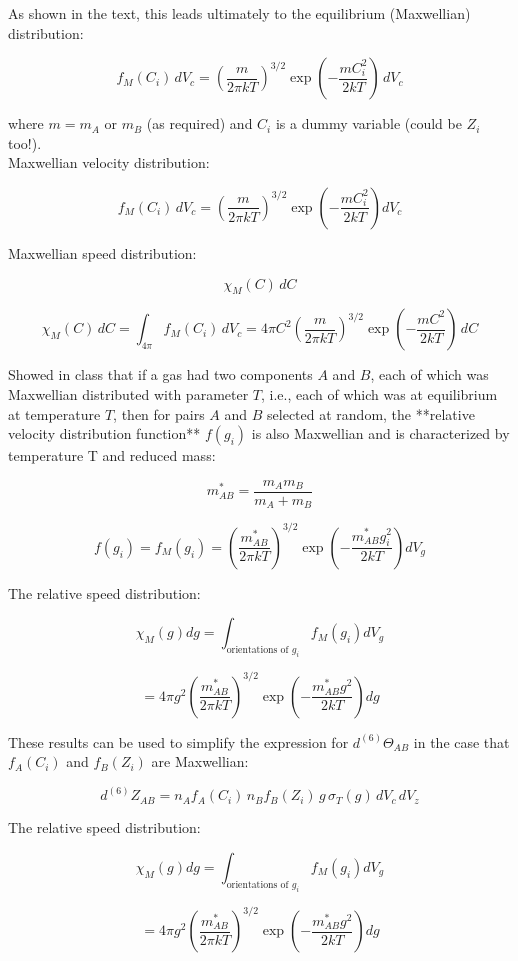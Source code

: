 \documentclass{article}
\begin{document}
As shown in the text, this leads ultimately to the equilibrium (Maxwellian) distribution:

\[
f_M(C_i) \, dV_c = \left( \frac{m}{2\pi k T} \right)^{3/2} \exp \left( - \frac{m C_i^2}{2 k T} \right) \, dV_c
\]

where \( m = m_A \) or \( m_B \) (as required) and \( C_i \) is a dummy variable (could be \( Z_i \) too!).\\


Maxwellian velocity distribution:

\[
f_M(C_i) \, dV_c = \left( \frac{m}{2\pi k T} \right)^{3/2} \exp \left( - \frac{m C_i^2}{2 k T} \right) dV_c
\]

Maxwellian speed distribution:

\[
\chi_M(C) \, dC
\]

\[
\chi_M(C) \, dC = \int_{4 \pi} f_M(C_i) \, dV_c = 4 \pi C^2 \left( \frac{m}{2\pi k T} \right)^{3/2} \exp \left( - \frac{m C^2}{2 k T} \right) \, dC
\]

Showed in class that if a gas had two components \( A \) and \( B \), each of which was Maxwellian distributed with parameter \( T \), i.e., each of which was at equilibrium at temperature \( T \), then for pairs \( A \) and \( B \) selected at random, the **relative velocity distribution function** \( f(g_i) \) is also Maxwellian and is characterized by temperature T and reduced mass:

\[
m_{AB}^* = \frac{m_A m_B}{m_A + m_B}
\]

\[
f(g_i) = f_M(g_i) = \left( \frac{m_{AB}^*}{2\pi k T} \right)^{3/2} \exp \left( - \frac{m_{AB}^* g_i^2}{2kT} \right) dV_g
\]

The relative speed distribution:

\[
\chi_M(g) dg = \int_{\text{orientations of } g_i} f_M(g_i) dV_g
\]

\[
= 4\pi g^2 \left( \frac{m_{AB}^*}{2 \pi k T} \right)^{3/2} \exp \left( - \frac{m_{AB}^* g^2}{2 k T} \right) dg
\]

These results can be used to simplify the expression for \( d^{(6)} \Theta_{AB} \) in the case that \( f_A(C_i) \) and \( f_B(Z_i) \) are Maxwellian:

\[
d^{(6)} Z_{AB} = n_A f_A(C_i) \, n_B f_B(Z_i) \, g \, \sigma_T(g) \, dV_c \, dV_z
\]

The relative speed distribution:

\[
\chi_M(g) dg = \int_{\text{orientations of } g_i} f_M(g_i) dV_g
\]

\[
= 4 \pi g^2 \left( \frac{m_{AB}^*}{2 \pi k T} \right)^{3/2} \exp \left( - \frac{m_{AB}^* g^2}{2 k T} \right) dg
\]
\end{document}
